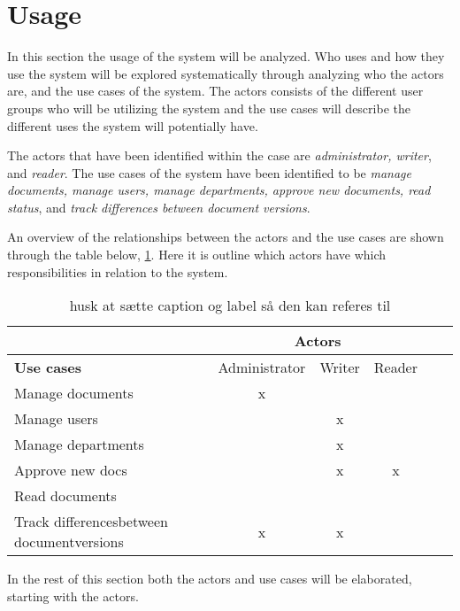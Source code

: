 \section{Usage}\label{sec:Usage}
In this section the usage of the system will be analyzed.
Who uses and how they use the system will be explored systematically through analyzing who the actors are, and the use cases of the system.
The actors consists of the different user groups who will be utilizing the system and the use cases will describe the different uses the system will potentially have.

The actors that have been identified within the case are \textit{administrator, writer}, and \textit{reader}.
The use cases of the system have been identified to be \textit{manage documents, manage users, manage departments, approve new documents, read status}, and \textit{track differences between document versions}.

An overview of the relationships between the actors and the use cases are shown through the table below, \cref{tab:UseCases}.
Here it is outline which actors have which responsibilities in relation to the system.

\begin{table}[H]
	\begin{center}
	\begin{tabular}{| m{10em} | c | c | c | c | c |}
		\hline
		& \multicolumn{3}{c|}{\textbf{Actors}} \\
		\hline
		\textbf{Use cases} & Administrator  & Writer & Reader \\
		\hline
		Manage documents & x & & \\
		\hline
		Manage users & & x & \\
		\hline
		Manage departments & & x & \\
		\hline
		Approve new docs & & x & x \\
		\hline
		Read documents & & & \\
		\hline
		Track differences\newline between document\newline versions & x & x &\\
		\hline
	\end{tabular}
	\end{center}
	\caption{ {\color{red}husk at sætte caption og label så den kan referes til} }\label{tab:UseCases}
\end{table}

In the rest of this section both the actors and use cases will be elaborated, starting with the actors.

